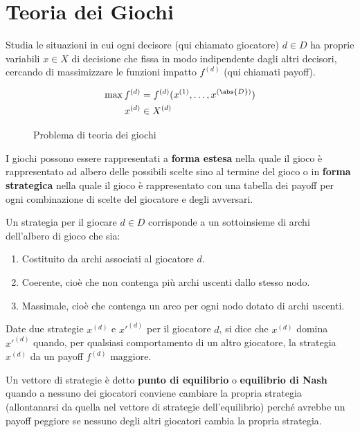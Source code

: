 \documentclass[\main/main.tex]{subfiles}
\begin{document}
\chapter{Teoria dei Giochi}
Studia le situazioni in cui ogni decisore (qui chiamato giocatore) $d \in D$ ha proprie variabili $x \in X$ di decisione che fissa in modo indipendente dagli altri decisori, cercando di massimizzare le funzioni impatto $f^{(d)}$ (qui chiamati payoff).

\begin{figure}
	\begin{align*}
		\max f^{(d)} & = f^{(d)}(x^{(1)}, \ldots, x^{(\abs{D})}) \\
		x^{(d)}      & \in X^{(d)}
	\end{align*}
	\caption{Problema di teoria dei giochi}
\end{figure}

I giochi possono essere rappresentati a \textbf{forma estesa} nella quale il gioco è rappresentato ad albero delle possibili scelte sino al termine del gioco o in \textbf{forma strategica} nella quale il gioco è rappresentato con una tabella dei payoff per ogni combinazione di scelte del giocatore e degli avversari.

\begin{definition}[Strategia]
	Un strategia per il giocare $d \in D$ corrisponde a un sottoinsieme di archi dell'albero di gioco che sia:
	\begin{enumerate}
		\item Costituito da archi associati al giocatore $d$.
		\item Coerente, cioè che non contenga più archi uscenti dallo stesso nodo.
		\item Massimale, cioè che contenga un arco per ogni nodo dotato di archi uscenti.
	\end{enumerate}
\end{definition}

\begin{definition}
	Date due strategie $x^{(d)}$ e $x'^{(d)}$ per il giocatore $d$, si dice che $x^{(d)}$ domina $x'^{(d)}$ quando, per qualsiasi comportamento di un altro giocatore, la strategia $x^{(d)}$ da un payoff $f^{(d)}$ maggiore.
\end{definition}

\begin{definition}
	Un vettore di strategie è detto \textbf{punto di equilibrio} o \textbf{equilibrio di Nash} quando a nessuno dei giocatori conviene cambiare la propria strategia (allontanarsi da quella nel vettore di strategie dell'equilibrio) perché avrebbe un payoff peggiore se nessuno degli altri giocatori cambia la propria strategia.
\end{definition}
\end{document}
